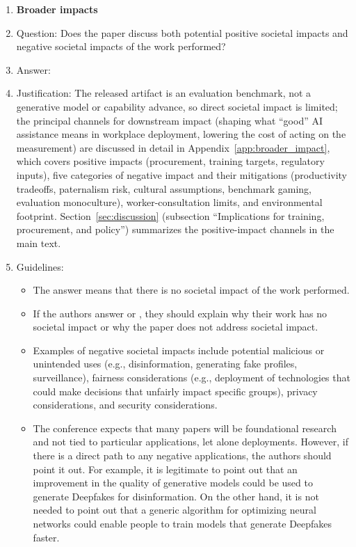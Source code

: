 \begin{enumerate}
\item {\bf Broader impacts}
    \item[] Question: Does the paper discuss both potential positive societal impacts and negative societal impacts of the work performed?
    \item[] Answer: \answerYes{}
    \item[] Justification: The released artifact is an evaluation benchmark, not a generative model or capability advance, so direct societal impact is limited; the principal channels for downstream impact (shaping what ``good'' AI assistance means in workplace deployment, lowering the cost of acting on the measurement) are discussed in detail in Appendix~\ref{app:broader_impact}, which covers positive impacts (procurement, training targets, regulatory inputs), five categories of negative impact and their mitigations (productivity tradeoffs, paternalism risk, cultural assumptions, benchmark gaming, evaluation monoculture), worker-consultation limits, and environmental footprint. Section~\ref{sec:discussion} (subsection ``Implications for training, procurement, and policy'') summarizes the positive-impact channels in the main text.
    \item[] Guidelines:
    \begin{itemize}
        \item The answer \answerNA{} means that there is no societal impact of the work performed.
        \item If the authors answer \answerNA{} or \answerNo, they should explain why their work has no societal impact or why the paper does not address societal impact.
        \item Examples of negative societal impacts include potential malicious or unintended uses (e.g., disinformation, generating fake profiles, surveillance), fairness considerations (e.g., deployment of technologies that could make decisions that unfairly impact specific groups), privacy considerations, and security considerations.
        \item The conference expects that many papers will be foundational research and not tied to particular applications, let alone deployments. However, if there is a direct path to any negative applications, the authors should point it out. For example, it is legitimate to point out that an improvement in the quality of generative models could be used to generate Deepfakes for disinformation. On the other hand, it is not needed to point out that a generic algorithm for optimizing neural networks could enable people to train models that generate Deepfakes faster.

\end{itemize}
\end{enumerate}

